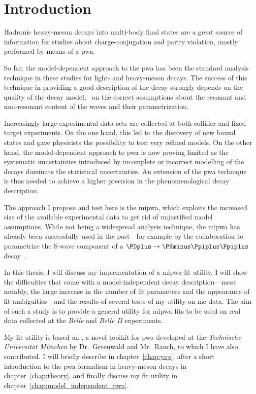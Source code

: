 \chapter{Introduction}
\label{chap:introduction}

    Hadronic heavy-meson decays into multi-body final states are a great source of information for studies about charge-conjugation and parity violation, mostly performed by means of a \ac{pwa}.


    So far, the model-dependent approach to the \ac{pwa} has been the standard analysis technique in these studies for light- and heavy-meson decays.
    The success of this technique in providing a good description of the decay strongly depends on the quality of the decay model, \ie~on the correct assumptions about the resonant and non-resonant content of the waves and their parametrization.


    Increasingly large experimental data sets are collected at both collider and fixed-target experiments.
    On the one hand, this led to the discovery of new bound states and gave physicists the possibility to test very refined models.
    On the other hand, the model-dependent approach to \ac{pwa} is now proving limited as the systematic uncertainties introduced by incomplete or incorrect modelling of the decays dominate the statistical uncertainties.
    An extension of the \ac{pwa} technique is thus needed to achieve a higher precision in the phenomenological decay description.


    The approach I propose and test here is the \ac{mipwa}, which exploits the increased size of the available experimental data to get rid of unjustified model assumptions.
    While not being a widespread analysis technique, the \ac{mipwa} has already been successfully used in the past---for example by the \focus{} collaboration to parametrize the S-wave component of a $\PDplus\to\PKminus\Ppiplus\Ppiplus$ decay~\cite{Link200914}.


    In this thesis, I will discuss my implementation of a \ac{mipwa}-fit utility.
    I will show the difficulties that come with a model-independent decay description---most notably, the large increase in the number of fit parameters and the appearance of fit ambiguities---and the results of several tests of my utility on \ac{mc} data.
    The aim of such a study is to provide a general utility for \ac{mipwa} fits to be used on real data collected at the \textsl{Belle} and \textsl{Belle II} experiments.


    My fit utility is based on , a novel \cpp{} toolkit for \ac{pwa} developed at the \textsl{Technische Universit\"at M\"unchen} by Dr.~Greenwald and Mr.~Rauch, to which I have also contributed.
    I will briefly describe  in chapter~\ref{chap:yap}, after a short introduction to the \ac{pwa} formalism in heavy-meson decays in chapter~\ref{chap:theory}, and finally discuss my fit utility in chapter~\ref{chap:model_independent_pwa}.
